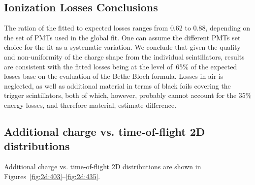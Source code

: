 \documentclass{article}[a4paper,12pt]
\begin{document}
\begin{table}[p]

  \caption{Fit results using 5 PMTs in the fit, using both protons and deuterons.}
  \label{tab_fitres_5}
\end{table}

\clearpage


\subsection{Ionization Losses Conclusions}

The ration of the fitted to expected losses ranges from 0.62 to 0.88, depending on the set of PMTs used in the global fit. One can assume the different PMTs set choice for the fit as a systematic variation.
We conclude that given the quality and non-uniformity of the charge shape from the individual scintillators, results are consistent with the fitted losses being at the level of~65\% of the expected losses base on the evaluation of the Bethe-Bloch formula.
Losses in air is neglected, as well as additional material in terms of black foils covering the trigger scintillators, both of which, however, probably cannot account for the 35\% energy losses, and therefore material, estimate difference.

\subsection{Additional charge vs. time-of-flight 2D distributions}
Additional charge vs. time-of-flight 2D distributions are shown in Figures~\ref{fig:2d:403}--\ref{fig:2d:435}.

\end{document}
